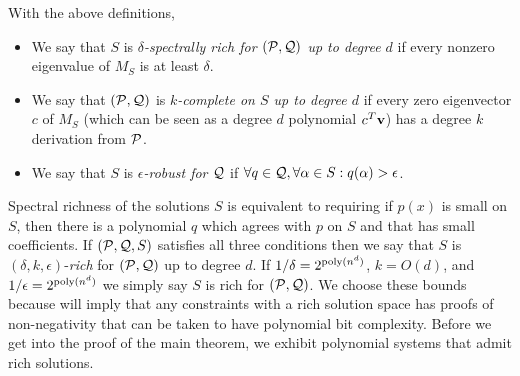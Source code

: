 \begin{definition}\label{def:nice}
With the above definitions, 
\begin{itemize}
\item We say that $S$ is \emph{$\delta$-spectrally rich for $(\mathcal P, \mathcal Q)$ up to degree $d$} if every nonzero eigenvalue of $M_S$ is at least $\delta$.
\item We say that $(\mathcal P, \mathcal Q)$ is \emph{$k$-complete on $S$ up to degree $d$} if every zero eigenvector $c$ of $M_S$ (which can be seen as a degree $d$ polynomial $c^T{\bf v}$) has a degree $k$ derivation from $\mathcal P$. 
\item We say that $S$ is \emph{$\epsilon$-robust for $\mathcal Q$} if $\forall q \in \mathcal Q, \forall \alpha \in S: q(\alpha) > \epsilon$.
\end{itemize}
\end{definition}
Spectral richness of the solutions $S$ is equivalent to requiring if $p(x)$ is small on $S$, then there is a polynomial $q$ which agrees with $p$ on $S$ and that has small coefficients. If $(\mathcal P, \mathcal Q, S)$ satisfies all three conditions then we say that $S$ is $(\delta, k, \epsilon)$-\emph{rich} for $(\mathcal P, \mathcal Q)$ up to degree $d$. If $1/\delta = 2^{\operatorname{poly}(n^d)}$, $k = O(d)$, and $1/\epsilon = 2^{\operatorname{poly}(n^d)}$ we simply say $S$ is rich for $(\mathcal P, \mathcal Q)$. We choose these bounds because  will imply that any constraints with a rich solution space has proofs of non-negativity that can be taken to have polynomial bit complexity. Before we get into the proof of the main theorem, we exhibit polynomial systems that admit rich solutions.

